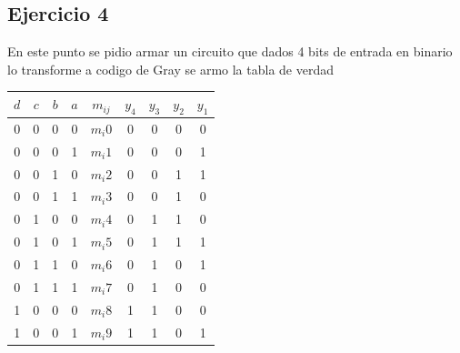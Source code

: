 \documentclass[a4paper]{article}
\begin{document}
\subsection*{Ejercicio 4}
En este punto se pidio armar un circuito que dados 4 bits de entrada en binario lo transforme a codigo de Gray  se armo la tabla de verdad 
\begin{table}[H]
\centering
\begin{tabular}{|c|c|c|c|c|c|c|c|c|}
\hline
\textbf{$d$} & \textbf{$c$} & \textbf{$b$} & \textbf{$a$} & \textbf{$m_{ij}$} & \textbf{$y_4$} & \textbf{$y_3$} & \textbf{$y_2$} & \textbf{$y_1$} \\ \hline
0              & 0              & 0              & 0              & \textbf{$m_i0$}   & 0              & 0              & 0              & 0              \\ \hline
0              & 0              & 0              & 1              & \textbf{$m_i1$}   & 0              & 0              & 0              & 1              \\ \hline
0              & 0              & 1              & 0              & \textbf{$m_i2$}   & 0              & 0              & 1              & 1              \\ \hline
0              & 0              & 1              & 1              & \textbf{$m_i3$}   & 0              & 0              & 1              & 0              \\ \hline
0              & 1              & 0              & 0              & \textbf{$m_i4$}   & 0              & 1              & 1              & 0              \\ \hline
0              & 1              & 0              & 1              & \textbf{$m_i5$}   & 0              & 1              & 1              & 1              \\ \hline
0              & 1              & 1              & 0              & \textbf{$m_i6$}   & 0              & 1              & 0              & 1              \\ \hline
0              & 1              & 1              & 1              & \textbf{$m_i7$}   & 0              & 1              & 0              & 0              \\ \hline
1              & 0              & 0              & 0              & \textbf{$m_i8$}   & 1              & 1              & 0              & 0              \\ \hline
1              & 0              & 0              & 1              & \textbf{$m_i9$}   & 1              & 1              & 0              & 1              \\ \hline

\end{tabular}
\end{table}
\end{document}
